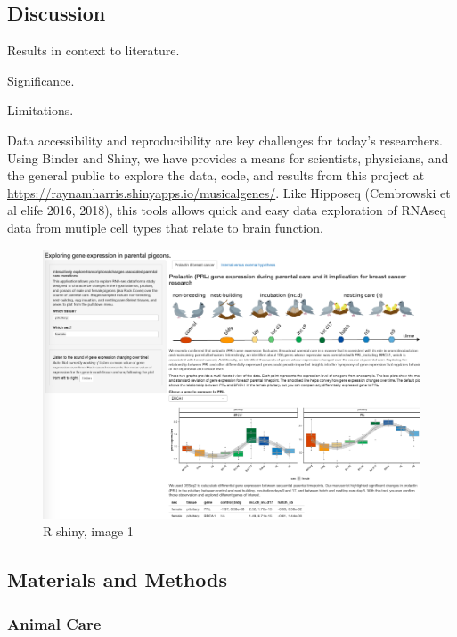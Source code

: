 \hypertarget{discussion}{%
\subsection{Discussion}\label{discussion}}

Results in context to literature.

Significance.

Limitations.

Data accessibility and reproducibility are key challenges for today's
researchers. Using Binder and Shiny, we have provides a means for
scientists, physicians, and the general public to explore the data,
code, and results from this project at
\url{https://raynamharris.shinyapps.io/musicalgenes/}. Like Hipposeq
(Cembrowski et al elife 2016, 2018), this tools allows quick and easy
data exploration of RNAseq data from mutiple cell types that relate to
brain function.

\begin{figure}[h]
  \centering
  \includegraphics[width=1.0\textwidth]{../../figures/supplfig3}
  \caption{R shiny, image 1}
  \label{figure:supplfig3}
\end{figure}

\hypertarget{materials-and-methods}{%
\subsection{Materials and Methods}\label{materials-and-methods}}

\hypertarget{animal-care}{%
\subsubsection{Animal Care}\label{animal-care}}

